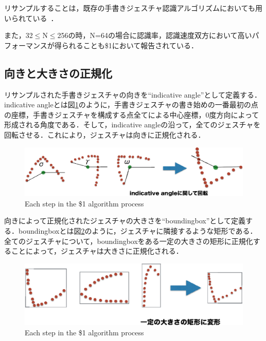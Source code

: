 リサンプルすることは，既存の手書きジェスチャ認識アルゴリズムにおいても用いられている~\cite{Plamondon:2000:OOH:331097.331275, Tappert:1990:SAO:83123.83137, Kristensson:2004:SLV:1029632.1029640, Zhai:2003:SWS:642611.642630, Tappert:1982:CSR:1664966.1664979}．


また，32$\leq$N$\leq$256の時，N=64の場合に認識率，認識速度双方において高いパフォーマンスが得られることも\$1において報告されている．

\subsection{向きと大きさの正規化}
リサンプルされた手書きジェスチャの向きを``indicative angle''として定義する．indicative angleとは図\ref{fig:orientation}のように，手書きジェスチャの書き始めの一番最初の点の座標，手書きジェスチャを構成する点全てによる中心座標，0度方向によって形成される角度である．そして，indicative angleの沿って，全てのジェスチャを回転させる．これにより，ジェスチャは向きに正規化される．

\begin{figure} [!h]
\centering
\includegraphics [width=0.8\columnwidth]{img/orientation.eps}
\caption{Each step in the \$1 algorithm process}
\label{fig:orientation}
\end{figure}

向きによって正規化されたジェスチャの大きさを``boundingbox''として定義する．boundingboxとは図\ref{fig:size}のように，ジェスチャに隣接するような矩形である．全てのジェスチャについて，boundingboxをある一定の大きさの矩形に正規化することによって，ジェスチャは大きさに正規化される．

\begin{figure} [!h]
\centering
\includegraphics [width=0.8\columnwidth]{img/size.eps}
\caption{Each step in the \$1 algorithm process}
\label{fig:size}
\end{figure}

